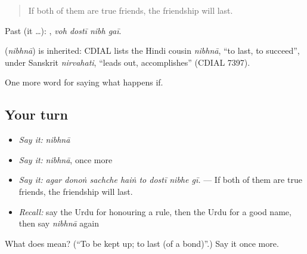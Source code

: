 \begin{quote}
If both of them are true friends, the friendship will last.
\end{quote}

Past (it …):    , \emph{voh dostī nibh gaī}.

\begin{cousinweb}
\textbf{} (\emph{nibhnā}) is inherited: CDIAL lists the Hindi cousin \emph{nibhnā}, \textquotedblleft{}to last, to succeed\textquotedblright{}, under Sanskrit \emph{nirvahati}, \textquotedblleft{}leads out, accomplishes\textquotedblright{} (CDIAL 7397).
\end{cousinweb}

\begin{grammarlens}[title={What you've built}]
One more word for saying what happens if.
\end{grammarlens}

\subsection*{Your turn}
\begin{itemize}
\raggedright
  \item \emph{Say it:} \emph{nibhnā}
  \item \emph{Say it:} \emph{nibhnā}, once more
  \item \emph{Say it:} \emph{agar donoṅ sachche haiṅ to dostī nibhe gī.} — If both of them are true friends, the friendship will last.
  \item \emph{Recall:} say the Urdu for honouring a rule, then the Urdu for a good name, then say \emph{nibhnā} again
\end{itemize}

\begin{tcolorbox}[breakable,colback=teal!4,colframe=teal!35!black,title={Before you move on}]
What does  mean? (\textquotedblleft{}To be kept up; to last (of a bond)\textquotedblright{}.) Say it once more.
\end{tcolorbox}
